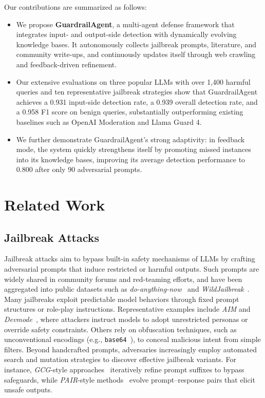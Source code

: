 \documentclass[letterpaper,twocolumn,10pt]{article}
\newcommand{\agentname}{GuardrailAgent\xspace}
\begin{document}
Our contributions are summarized as follows:
\begin{itemize}
    \item We propose \textbf{\agentname}, a multi-agent defense framework that integrates input- and output-side detection with dynamically evolving knowledge bases.
    It autonomously collects jailbreak prompts, literature, and community write-ups, and continuously updates itself through web crawling and feedback-driven refinement.
    \item Our extensive evaluations on three popular LLMs with over 1,400 harmful queries and ten representative jailbreak strategies show that \agentname achieves a 0.931 input-side detection rate, a 0.939 overall detection rate, and a 0.958 F1 score on benign queries, substantially outperforming existing baselines such as OpenAI Moderation and Llama Guard 4.
    \item We further demonstrate \agentname’s strong adaptivity: in feedback mode, the system quickly strengthens itself by promoting missed instances into its knowledge bases, improving its average detection performance to 0.800 after only 90 adversarial prompts.
\end{itemize}

\section{Related Work}

\subsection{Jailbreak Attacks}
\label{section:jailbreak_attack}

Jailbreak attacks aim to bypass built-in safety mechanisms of LLMs by crafting adversarial prompts that induce restricted or harmful outputs.
Such prompts are widely shared in community forums and red-teaming efforts, and have been aggregated into public datasets such as \emph{do-anything-now}~\cite{SCBSZ24} and \emph{WildJailbreak}~\cite{JRHEBKMLSCD24}.
Many jailbreaks exploit predictable model behaviors through fixed prompt structures or role-play instructions.
Representative examples include \emph{AIM} and \emph{Devmode}~\cite{SCBSZ24}, where attackers instruct models to adopt unrestricted personas or override safety constraints.
Others rely on obfuscation techniques, such as unconventional encodings (e.g., \texttt{base64}~\cite{RVNAC23}), to conceal malicious intent from simple filters.
Beyond handcrafted prompts, adversaries increasingly employ automated search and mutation strategies to discover effective jailbreak variants.
For instance, \emph{GCG}-style approaches~\cite{ZWCNKF23,LLLLCH24} iteratively refine prompt suffixes to bypass safeguards, while \emph{PAIR}-style methods~\cite{CRDHPW25,MZKNASK23} evolve prompt--response pairs that elicit unsafe outputs.
\end{document}
